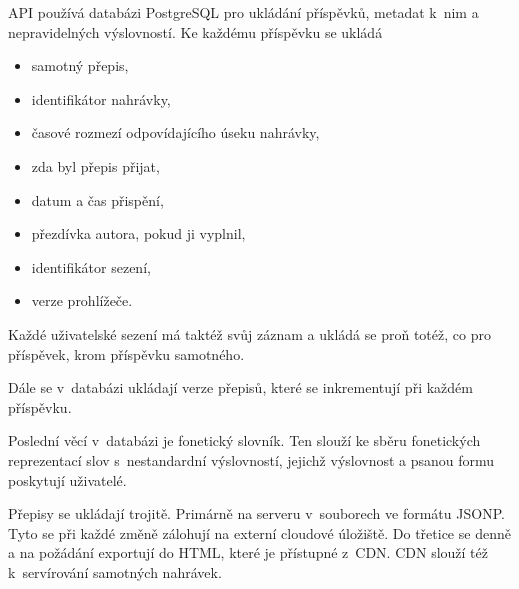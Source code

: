 API používá databázi PostgreSQL pro ukládání příspěvků, metadat k~nim a nepravidelných
výslovností. Ke každému příspěvku se ukládá
\begin{itemize}
\item{samotný přepis,}
\item{identifikátor nahrávky,}
\item{časové rozmezí odpovídajícího úseku nahrávky,}
\item{zda byl přepis přijat,}
\item{datum a čas přispění,}
\item{přezdívka autora, pokud ji vyplnil,}
\item{identifikátor sezení,}
\item{verze prohlížeče.}
\end{itemize}

Každé uživatelské sezení má taktéž svůj záznam a ukládá se proň totéž, co pro
příspěvek, krom příspěvku samotného.

Dále se v~databázi ukládají verze přepisů, které se inkrementují při každém
příspěvku.

Poslední věcí v~databázi je fonetický slovník. Ten slouží ke sběru fonetických
reprezentací slov s~nestandardní výslovností, jejichž výslovnost a psanou formu
poskytují uživatelé.

Přepisy se ukládají trojitě. Primárně na serveru v~souborech ve formátu JSONP.
Tyto se při každé změně zálohují na externí cloudové úložiště. Do třetice se
denně a na požádání exportují do HTML, které je přístupné z~CDN.
CDN slouží též k~servírování samotných nahrávek.

